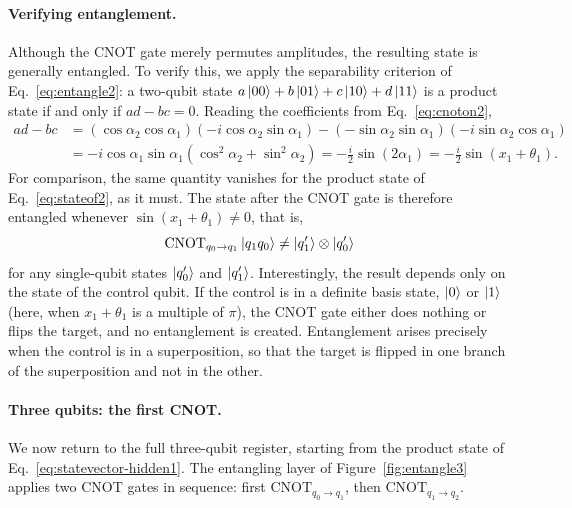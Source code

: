 \documentclass[12pt]{article}
\numberwithin{equation}{section}  %
\begin{document}
\paragraph{Verifying entanglement.} Although the CNOT gate merely permutes amplitudes, the resulting state is generally entangled. To verify this, we apply the separability criterion of Eq.~\eqref{eq:entangle2}: a two-qubit state $a\ket{00} + b\ket{01} + c\ket{10} + d\ket{11}$ is a product state if and only if $ad - bc = 0$. Reading the coefficients from Eq.~\eqref{eq:cnoton2},
\begin{equation}
\begin{aligned}
ad - bc
&= \left(\cos\alpha_2 \cos\alpha_1\right)\left(-i\cos\alpha_2 \sin\alpha_1\right) - \left(-\sin\alpha_2 \sin\alpha_1\right)\left(-i\sin\alpha_2 \cos\alpha_1\right) \\
&= -i \cos\alpha_1 \sin\alpha_1 \left(\cos^2\alpha_2 + \sin^2\alpha_2\right)
= -\frac{i}{2}\sin(2\alpha_1)
= -\frac{i}{2}\sin(x_1 + \theta_1).
\end{aligned}
\label{eq:cnot_entanglement_check}
\end{equation}
For comparison, the same quantity vanishes for the product state of Eq.~\eqref{eq:stateof2}, as it must. The state after the CNOT gate is therefore entangled whenever $\sin(x_1 + \theta_1) \neq 0$, that is,
\begin{equation}
\mathrm{CNOT}_{q_0 \to q_1} \ket{q_1 q_0} \neq \ket{q_1'} \otimes \ket{q_0'}
\end{equation}
for any single-qubit states $\ket{q_0'}$ and $\ket{q_1'}$. Interestingly, the result depends only on the state of the control qubit. If the control is in a definite basis state, $\ket{0}$ or $\ket{1}$ (here, when $x_1 + \theta_1$ is a multiple of $\pi$), the CNOT gate either does nothing or flips the target, and no entanglement is created. Entanglement arises precisely when the control is in a superposition, so that the target is flipped in one branch of the superposition and not in the other.

\paragraph{Three qubits: the first CNOT.} We now return to the full three-qubit register, starting from the product state of Eq.~\eqref{eq:statevector-hidden1}. The entangling layer of Figure~\ref{fig:entangle3} applies two CNOT gates in sequence: first $\mathrm{CNOT}_{q_0 \to q_1}$, then $\mathrm{CNOT}_{q_1 \to q_2}$.
\end{document}
